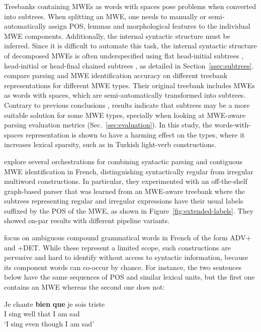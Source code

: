 \documentclass[output=paper]{LSP/langsci}
\begin{document}
Treebanks containing MWEs as words with spaces pose problems when converted into subtrees. 
When splitting an MWE, one needs to manually or semi-automatically assign POS, lemmas and morphological features to the individual MWE components. 
Additionally, the internal syntactic structure must be inferred.
Since it is difficult to automate this task, the internal syntactic structure of decomposed MWEs is often underspecified using flat head-initial subtrees \citep{seddah13}, head-initial \citep{nivre16} or head-final chained subtrees \citep{eryigit:2011:mes:2206359.2206365}, as detailed in Section~\ref{ssec:subtrees}.
\citet{eryigit:2011:mes:2206359.2206365} compare parsing and MWE identification accuracy on different treebank representations for different MWE types.
Their original treebank includes MWEs as words with spaces, which are semi-automatically transformed into subtrees.
Contrary to previous conclusions \citep{nivre04b}, results indicate that subtrees may be a more suitable solution for some MWE types, specially when looking at MWE-aware parsing evaluation metrics (Sec.~\ref{sec:evaluation}). In this study, the words-with-spaces representation is shown to have a harming effect on the types, where it increases lexical sparsity, such as in Turkish light-verb constructions.

\citet{candito2014strategies} explore several orchestrations for combining syntactic parsing and contiguous MWE identification in French, distinguishing syntactically regular from irregular multiword constructions. In particular, they experimented with an off-the-shelf graph-based parser that was learned from an MWE-aware treebank where the subtrees representing regular and irregular expressions have their usual labels suffixed by the POS of the MWE, as shown in Figure~\ref{fig:extended-labels}. They showed on-par results with different pipeline variants.


\citet{nasretal15} focus on ambiguous compound grammatical words in French of the form ADV+ and +DET.
While these represent a limited scope, such constructions are pervasive and hard to identify without access to syntactic information, because its component words can co-occur by chance. %
For instance, the two sentences below have the same sequences of POS and similar lexical units, but the first one contains an MWE whereas the second one does not:

\ea
\gll Je chante {\textbf{bien}} {\textbf{que}}  je sois triste\\  
     I  sing   well       that       I  am   sad\\
\glt `I sing even though I am sad'
\z 
\end{document}
